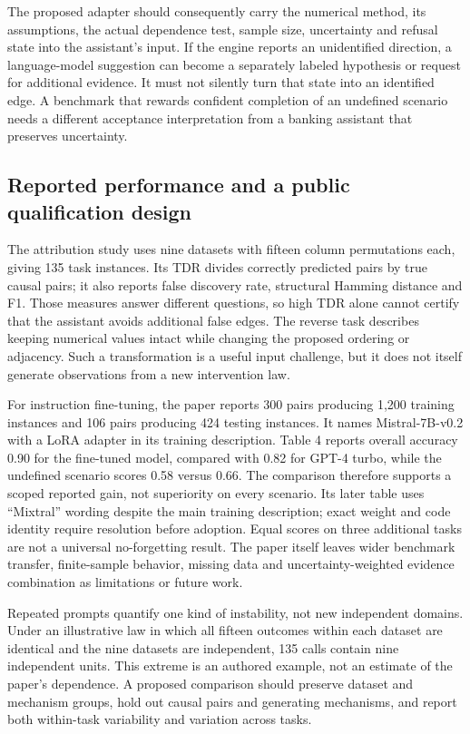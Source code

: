The proposed adapter should consequently carry the numerical method, its
assumptions, the actual dependence test, sample size, uncertainty and refusal
state into the assistant's input. If the engine reports an unidentified
direction, a language-model suggestion can become a separately labeled
hypothesis or request for additional evidence. It must not silently turn that
state into an identified edge. A benchmark that rewards confident completion
of an undefined scenario needs a different acceptance interpretation from a
banking assistant that preserves uncertainty.

\subsection{Reported performance and a public qualification design}
\label{exec20:pa-design}
The attribution study uses nine datasets with fifteen column permutations
each, giving 135 task instances. Its TDR divides correctly predicted pairs by
true causal pairs; it also reports false discovery rate, structural Hamming
distance and F1. Those measures answer different questions, so high TDR alone
cannot certify that the assistant avoids additional false edges. The reverse
task describes keeping numerical values intact while changing the proposed
ordering or adjacency. Such a transformation is a useful input challenge,
but it does not itself generate observations from a new intervention law.
\citep{exec20_attribution}

For instruction fine-tuning, the paper reports 300 pairs producing 1,200
training instances and 106 pairs producing 424 testing instances. It names
Mistral-7B-v0.2 with a LoRA adapter in its training description. Table 4 reports
overall accuracy 0.90 for the fine-tuned model, compared with 0.82 for
GPT-4 turbo, while the undefined scenario scores 0.58 versus 0.66. The
comparison therefore supports a scoped reported gain, not superiority on
every scenario. Its later table uses ``Mixtral'' wording despite the main
training description; exact weight and code identity require resolution
before adoption. Equal scores on three additional tasks are not a universal
no-forgetting result. The paper itself leaves wider benchmark transfer,
finite-sample behavior, missing data and uncertainty-weighted evidence
combination as limitations or future work.\citep{exec20_attribution}

Repeated prompts quantify one kind of instability, not new independent
domains. Under an illustrative law in which all fifteen outcomes within each
dataset are identical and the nine datasets are independent, 135 calls contain
nine independent units. This extreme is an authored example, not an estimate
of the paper's dependence. A proposed comparison should preserve dataset and
mechanism groups, hold out causal pairs and generating mechanisms, and report
both within-task variability and variation across tasks.
\citep{exec20_population_attribution_reference}

